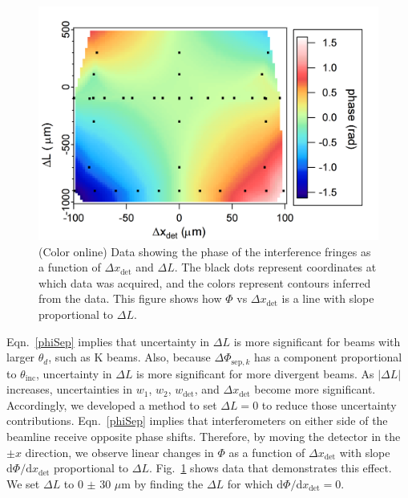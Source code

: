 \documentclass[twocolumn,prl,showpacs,superscriptaddress]{revtex4-1}   %
\newcommand{\figref}[1]{Fig.~\ref{#1}}
\newcommand{\eqnref}[1]{Eqn.~\eqref{#1}}
\newcommand{\dphisepk}{\Delta\Phi_{\mathrm{sep},k}}
\begin{document}
\begin{figure}
\includegraphics[scale=0.5]{phaseVsdxDetdLSurf_141202.png}
\caption{\label{PhaseVsThings}(Color online)
Data showing the phase of the interference fringes as a function of $\Delta x_{\mathrm{det}}$ and $\Delta L$. 
The black dots represent coordinates at which data was acquired, and the colors represent contours inferred from the data.
This figure shows how $\Phi$ vs $\Delta x_{\mathrm{det}}$ is a line with slope proportional to $\Delta L$. 
}
\end{figure}

\eqnref{phiSep} implies that uncertainty in $\Delta L$ is more significant for beams with larger $\theta_d$, such as K beams.
Also, because $\dphisepk$ has a component proportional to $\theta_{\mathrm{inc}}$, uncertainty in $\Delta L$ is more significant for more divergent beams.
As $|\Delta L|$ increases, uncertainties in $w_1$, $w_2$, $w_{\mathrm{det}}$, and $\Delta x_{\mathrm{det}}$ become more significant. Accordingly, we developed a method to set $\Delta L = 0$ to reduce those uncertainty contributions. 
\eqnref{phiSep} implies that interferometers on either side of the beamline receive opposite phase shifts. 
Therefore, by moving the detector in the $\pm x$ direction, we  observe linear changes in $\Phi$ as a function of $\Delta x_{\mathrm{det}}$ with slope $\mathrm{d}\Phi/\mathrm{d}x_{\mathrm{det}}$ proportional to $\Delta L$.
\figref{PhaseVsThings} shows data that demonstrates this effect.
We set $\Delta L$ to 0 $\pm$ 30 $\mu$m by finding the $\Delta L$ for which d$\Phi/$d$x_{\mathrm{det}} = 0$.
\end{document}

